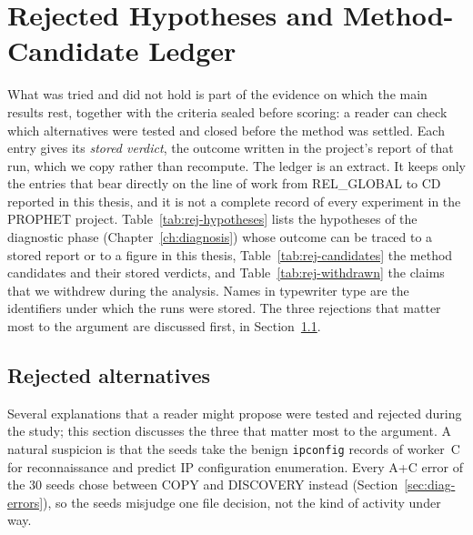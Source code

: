 \chapter{Rejected Hypotheses and Method-Candidate Ledger}
\label{app:rejected}

What was tried and did not hold is part of the evidence on which the
main results rest, together with the criteria sealed before scoring: a
reader can check which alternatives were tested and closed before the
method was settled. Each entry gives its \emph{stored verdict}, the
outcome written in the project's report of that run, which we copy
rather than recompute. The
ledger is an extract. It keeps only the entries that bear directly on
the line of work from REL\_GLOBAL to CD reported in this thesis, and it
is not a complete record of every experiment in the PROPHET project.
Table~\ref{tab:rej-hypotheses} lists the hypotheses of the diagnostic
phase (Chapter~\ref{ch:diagnosis}) whose outcome can be traced to a
stored report or to a figure in this thesis,
Table~\ref{tab:rej-candidates} the method candidates and their stored
verdicts, and Table~\ref{tab:rej-withdrawn} the claims that we withdrew
during the analysis. Names in typewriter type are the identifiers under
which the runs were stored. The three rejections that matter most to the
argument are discussed first, in Section~\ref{sec:disc-rejected}.

\section{Rejected alternatives}
\label{sec:disc-rejected}

Several explanations that a reader might propose were tested and
rejected during the study; this section discusses the three that
matter most to the argument. A natural suspicion is that the seeds take
the benign \texttt{ipconfig} records of worker~C for reconnaissance and
predict IP configuration enumeration. Every A+C error of the 30 seeds
chose between COPY and DISCOVERY instead (Section~\ref{sec:diag-errors}),
so the seeds misjudge one file decision, not the kind of activity under
way.

